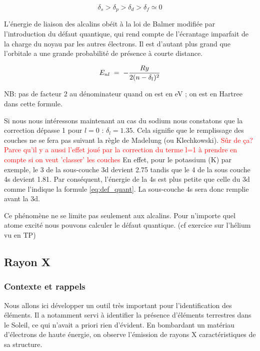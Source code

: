  $$\delta_s>\delta_p>\delta_d>\delta_f\simeq 0$$
 
L'énergie de liaison des alcalins obéit à la loi de Balmer modifiée par l’introduction du défaut quantique, qui rend compte de l’écrantage imparfait de la charge du noyau par les autres électrons. Il est d’autant plus grand que l’orbitale a une grande probabilité de présence à courte distance.
 
\begin{equation}
    E_{nl} \; = \;  - \dfrac{Ry}{2(n-\delta_l)^2}
    \label{eq:def_quant}
\end{equation}
 
NB: pas de facteur 2 au dénominateur quand on est en eV ; on est en Hartree dans cette formule. 
 
\vspace{0.2cm}
 
Si nous nous intéressons maintenant au cas du sodium nous constatons que la correction dépasse 1 pour $l=0$ : $\delta_l = 1.35$. Cela signifie que le remplissage des couches ne se fera pas suivant la règle de Madelung (ou  Klechkowski). \textcolor{red}{Sûr de ça? Parce qu'il y a aussi l'effet joué par la correction du terme l=1 à prendre en compte si on veut 'classer' les couches}
En effet, pour le potassium (K) par exemple, le 3 de la sous-couche 3d devient 2.75 tandis que le 4 de la sous couche 4s devient 1.81. Par conséquent, l’énergie de la 4s est plus petite que celle du 3d comme l'indique la formule \ref{eq:def_quant}. La sous-couche 4s sera donc remplie avant la 3d.
 
Ce phénomène ne se limite pas seulement aux alcalins. Pour  n'importe quel atome excité nous pouvons calculer le défaut quantique. (cf exercice sur l'hélium vu en TP)




\subsection{Rayon X}
\subsubsection{Contexte et rappels}


Nous allons ici développer un outil très important pour l'identification des éléments. Il a notamment servi à identifier la présence d'éléments terrestres dans le Soleil, ce qui n'avait a priori rien d'évident. En bombardant un matériau d'électrons de haute énergie, on observe l'émission de rayons X caractéristiques de sa structure.\\

